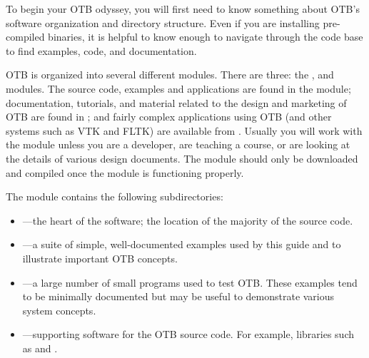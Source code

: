 To begin your OTB odyssey, you will first need to know something about OTB's
software organization and directory structure. Even if you are installing
pre-compiled binaries, it is helpful to know enough to navigate through the
code base to find examples, code, and documentation.

OTB is organized into several different modules. There are three:
the ,  and 
modules. The source code, examples and applications are found in the
 module; documentation, tutorials, and material related to the
design and marketing of OTB are found in ; and fairly
complex applications using OTB (and other systems such as VTK and FLTK)
are available from . Usually you will work with the
 module unless you are a developer, are teaching a course, or
are looking at the details of various design documents. The
 module should only be downloaded and
compiled once
the  module is functioning properly.

The  module contains the following subdirectories:
\begin{itemize}
        \item {}---the heart of the software; the location
        of the majority of the source code.
        \item {}---a suite of simple, well-documented
        examples used by this guide and to illustrate important
        OTB concepts.
        \item {}---a large number of small programs used
        to test OTB. These examples tend to be minimally documented but may
        be useful to demonstrate various system concepts. 
        \item {}---supporting software for the OTB
        source code. For example, libraries such as  and .
\end{itemize}

